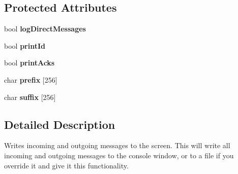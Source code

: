 \subsection*{Protected Attributes}
\begin{DoxyCompactItemize}
\item 
\hypertarget{class_rak_net_1_1_packet_logger_a271d3b45acc4969ab267155f10c90eb0}{bool {\bfseries log\-Direct\-Messages}}\label{class_rak_net_1_1_packet_logger_a271d3b45acc4969ab267155f10c90eb0}

\item 
\hypertarget{class_rak_net_1_1_packet_logger_a4c5215bc490d4e996ed06facbb24a4f7}{bool {\bfseries print\-Id}}\label{class_rak_net_1_1_packet_logger_a4c5215bc490d4e996ed06facbb24a4f7}

\item 
\hypertarget{class_rak_net_1_1_packet_logger_a4506de67ed45463fc1e9cb139e2e585d}{bool {\bfseries print\-Acks}}\label{class_rak_net_1_1_packet_logger_a4506de67ed45463fc1e9cb139e2e585d}

\item 
\hypertarget{class_rak_net_1_1_packet_logger_a7f0ad6be727a3124a5891ac7301b7925}{char {\bfseries prefix} \mbox{[}256\mbox{]}}\label{class_rak_net_1_1_packet_logger_a7f0ad6be727a3124a5891ac7301b7925}

\item 
\hypertarget{class_rak_net_1_1_packet_logger_a4495d375195310cbb01d15c890a0312f}{char {\bfseries suffix} \mbox{[}256\mbox{]}}\label{class_rak_net_1_1_packet_logger_a4495d375195310cbb01d15c890a0312f}

\end{DoxyCompactItemize}


\subsection{Detailed Description}
Writes incoming and outgoing messages to the screen. This will write all incoming and outgoing messages to the console window, or to a file if you override it and give it this functionality. 

